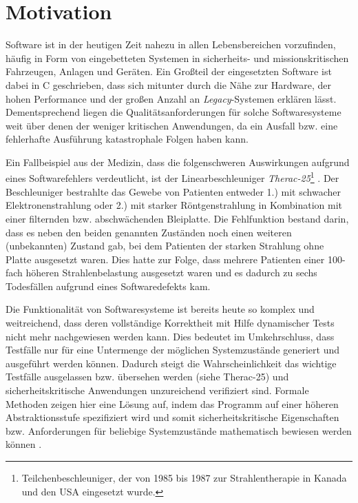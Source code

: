 \section{Motivation}


Software ist in der heutigen Zeit nahezu in allen Lebensbereichen vorzufinden, häufig in Form von eingebetteten Systemen in sicherheits- und missionskritischen Fahrzeugen, Anlagen und Geräten. Ein Großteil der eingesetzten Software ist dabei in C geschrieben, dass sich mitunter durch die Nähe zur Hardware, der hohen Performance und der großen Anzahl an \emph{Legacy}-Systemen erklären lässt. Dementsprechend liegen die Qualitätsanforderungen für solche Softwaresysteme weit über denen der weniger kritischen Anwendungen, da ein Ausfall bzw. eine fehlerhafte Ausführung katastrophale Folgen haben kann.


Ein Fallbeispiel aus der Medizin, dass die folgenschweren Auswirkungen aufgrund eines Softwarefehlers verdeutlicht, ist der Linearbeschleuniger \emph{Therac-25}\footnote{Teilchenbeschleuniger, der von 1985 bis 1987 zur Strahlentherapie in Kanada und den USA eingesetzt wurde.} \cite{Pfeifer2003}. Der Beschleuniger bestrahlte das Gewebe von Patienten entweder 1.) mit schwacher Elektronenstrahlung oder 2.) mit starker Röntgenstrahlung in Kombination mit einer filternden bzw. abschwächenden Bleiplatte. Die Fehlfunktion bestand darin, dass es neben den beiden genannten Zuständen noch einen weiteren (unbekannten) Zustand gab, bei dem Patienten der starken Strahlung ohne Platte ausgesetzt waren. Dies hatte zur Folge, dass mehrere Patienten einer 100-fach höheren Strahlenbelastung ausgesetzt waren und es dadurch zu sechs Todesfällen aufgrund eines Softwaredefekts kam.


Die Funktionalität von Softwaresysteme ist bereits heute so komplex und weitreichend, dass deren vollständige Korrektheit mit Hilfe dynamischer Tests nicht mehr nachgewiesen werden kann. Dies bedeutet im Umkehrschluss, dass Testfälle nur für eine Untermenge der möglichen Systemzustände generiert und ausgeführt werden können. Dadurch steigt die Wahrscheinlichkeit das wichtige Testfälle ausgelassen bzw. übersehen werden (siehe Therac-25) und sicherheitskritische Anwendungen unzureichend verifiziert sind. Formale Methoden zeigen hier eine Lösung auf, indem das Programm auf einer höheren Abstraktionsstufe spezifiziert wird und somit sicherheitskritische Eigenschaften bzw. Anforderungen für beliebige Systemzustände mathematisch bewiesen werden können \cite{Crocker2007}.
